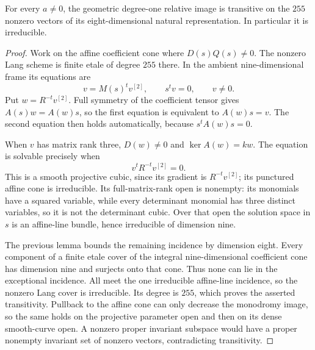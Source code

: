 \begin{lemma}
\label{lem:mixed-degree-one-Lang-transitive-candidate}
For every $a\ne0$, the geometric degree-one relative image is
transitive on the $255$ nonzero vectors of its eight-dimensional
natural representation. In particular it is irreducible.
\end{lemma}
\begin{proof}
Work on the affine coefficient cone where $D(s)Q(s)\ne0$.
The nonzero Lang scheme is finite etale of degree $255$ there.
In the ambient nine-dimensional frame its equations are
\[
                    v=M(s)^tv^{[2]},\qquad s^tv=0,\qquad v\ne0.
\]
Put $w=R^{-t}v^{[2]}$. Full symmetry of the coefficient tensor
gives $A(s)w=A(w)s$, so the first equation is equivalent to
$A(w)s=v$. The second equation then holds automatically,
because $s^tA(w)s=0$.

When $v$ has matrix rank three, $D(w)\ne0$ and
$\ker A(w)=kw$. The equation is solvable precisely when
\[
                         v^tR^{-t}v^{[2]}=0.
\]
This is a smooth projective cubic, since its gradient is
$R^{-t}v^{[2]}$; its punctured affine cone is irreducible.
Its full-matrix-rank open is nonempty: its monomials have a
squared variable, while every determinant monomial has three
distinct variables, so it is not the determinant cubic.
Over that open the solution space in $s$ is an affine-line
bundle, hence irreducible of dimension nine.

The previous lemma bounds the remaining incidence by dimension
eight. Every component of a finite etale cover of the integral
nine-dimensional coefficient cone has dimension nine and
surjects onto that cone. Thus none can lie in the exceptional
incidence. All meet the one irreducible affine-line incidence,
so the nonzero Lang cover is irreducible. Its degree is $255$,
which proves the asserted transitivity. Pullback to the affine
cone can only decrease the monodromy image, so the same holds
on the projective parameter open and then on its dense
smooth-curve open. A nonzero proper invariant subspace would
have a proper nonempty invariant set of nonzero vectors,
contradicting transitivity.
\end{proof}

